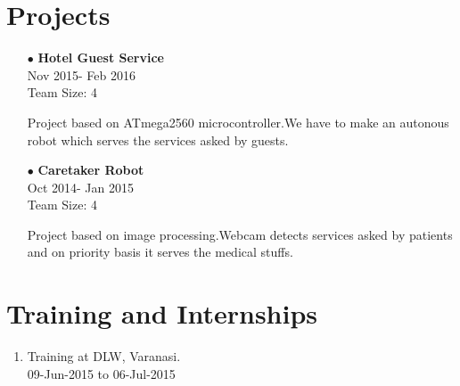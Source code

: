 \documentclass[11pt]{article}
\begin{document}
	\section*{Projects}
	\begin{itemize}
		\item[$\bullet$]\textbf{Hotel Guest Service}\\Nov 2015- Feb 2016\\Team Size: 4
		
		Project based on ATmega2560 microcontroller.We have to make an autonous robot which serves the services asked by guests.
		\item[$\bullet$]
		\textbf{Caretaker Robot}\\Oct 2014- Jan 2015\\Team Size: 4
		
		Project based on image processing.Webcam detects services asked by patients and on priority basis it serves the medical stuffs. 
	\end{itemize}
	\section*{Training and Internships}
	\begin{enumerate}
		\item Training at DLW, Varanasi.\\09-Jun-2015 to 06-Jul-2015
	\end{enumerate}

	
\end{document}
